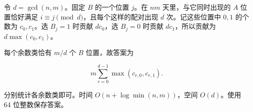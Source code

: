 \Legend
令 $d=\gcd(n,m)$。固定 $B$ 的一个位置 $j$。在 $n m$ 天里，与它同时出现的 $A$ 位置恰好满足 $i\equiv j\pmod d$，且每个这样的配对出现 $d$ 次。记这些位置中 $0,1$ 的个数为 $c_0,c_1$。选 $B_j=1$ 时贡献 $d c_0$，选 $B_j=0$ 时贡献 $d c_1$，所以贡献为 $d\max(c_0,c_1)$。

每个余数类恰有 $m/d$ 个 $B$ 位置，故答案为

$$m\sum_{r=0}^{d-1}\max(c_{r,0},c_{r,1}).$$

分别统计各余数类即可。时间 $O(n+\log\min(n,m))$，空间 $O(d)$。使用 64 位整数保存答案。
